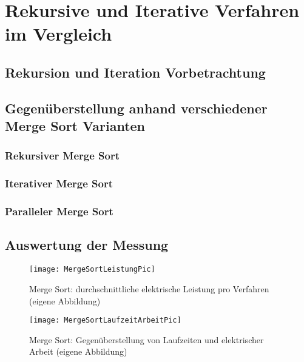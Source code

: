 \chapter{Rekursive und Iterative Verfahren im Vergleich}
\section{Rekursion und Iteration Vorbetrachtung}
\section{Gegenüberstellung anhand verschiedener Merge Sort Varianten}
\subsection{Rekursiver Merge Sort}
\subsection{Iterativer Merge Sort}
\subsection{Paralleler Merge Sort}
\section{Auswertung der Messung}



\begin{figure}[H]
	\begin{center}	 
	\texttt{[image: MergeSortLeistungPic]}
	\caption{Merge Sort: durchschnittliche elektrische Leistung pro Verfahren (eigene Abbildung)}
	\label{fig:MergeSortLeistungPic} 
	\end{center}
\end{figure}



\begin{figure}[H]
	\begin{center}	 
	\texttt{[image: MergeSortLaufzeitArbeitPic]}
	\caption{Merge Sort: Gegenüberstellung von Laufzeiten und elektrischer Arbeit (eigene Abbildung)}
	\label{fig:MergeSortLaufzeitArbeitPic} 
	\end{center}
\end{figure}
